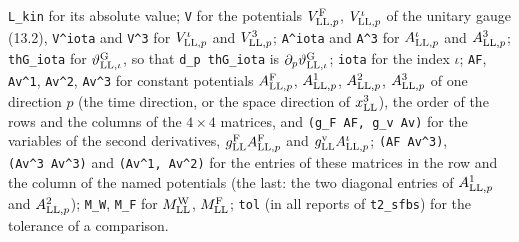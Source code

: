 \documentclass[
  10pt,
]{article}
\begin{document}
\texttt{\textbar{}L\_kin\textbar{}} for its absolute value; \texttt{V}
for the potentials \(V^{\rm F}_{{\rm LL},p}\), \(V^\iota_{{\rm LL},p}\)
of the unitary gauge (13.2), \texttt{V\^{}iota} and \texttt{V\^{}3} for
\(V^\iota_{{\rm LL},p}\) and \(V^3_{{\rm LL},p}\); \texttt{A\^{}iota}
and \texttt{A\^{}3} for \(A^\iota_{{\rm LL},p}\) and
\(A^3_{{\rm LL},p}\); \texttt{thG\_iota} for
\(\vartheta^{\rm G}_{{\rm LL},\iota}\), so that \texttt{d\_p\ thG\_iota}
is \(\partial_p\vartheta^{\rm G}_{{\rm LL},\iota}\); \texttt{iota} for
the index \(\iota\); \texttt{AF}, \texttt{Av\^{}1}, \texttt{Av\^{}2},
\texttt{Av\^{}3} for constant potentials \(A^{\rm F}_{{\rm LL},p}\),
\(A^1_{{\rm LL},p}\), \(A^2_{{\rm LL},p}\), \(A^3_{{\rm LL},p}\) of one
direction \(p\) (the time direction, or the space direction of
\(x^3_{\rm LL}\)), the order of the rows and the columns of the
\(4\times4\) matrices, and \texttt{(g\_F\ AF,\ g\_v\ Av)} for the
variables of the second derivatives,
\(g^{\rm F}_{\rm LL}A^{\rm F}_{{\rm LL},p}\) and
\(g^{\rm v}_{\rm LL}A^\iota_{{\rm LL},p}\); \texttt{(AF\ Av\^{}3)},
\texttt{(Av\^{}3\ Av\^{}3)} and \texttt{(Av\^{}1,\ Av\^{}2)} for the
entries of these matrices in the row and the column of the named
potentials (the last: the two diagonal entries of \(A^1_{{\rm LL},p}\)
and \(A^2_{{\rm LL},p}\)); \texttt{M\_W}, \texttt{M\_F} for
\(M^{\rm W}_{\rm LL}\), \(M^{\rm F}_{\rm LL}\); \texttt{tol} (in all
reports of \texttt{t2\_sfbs}) for the tolerance of a comparison.
\end{document}
